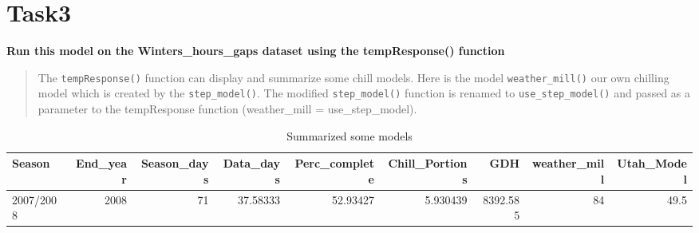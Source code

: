 \documentclass[
]{book}
\newenvironment{Shaded}{\begin{snugshade}}{\end{snugshade}}
\newcommand{\CommentTok}[1]{\textcolor[rgb]{0.56,0.35,0.01}{\textit{#1}}}
\newcommand{\DataTypeTok}[1]{\textcolor[rgb]{0.13,0.29,0.53}{#1}}
\newcommand{\DecValTok}[1]{\textcolor[rgb]{0.00,0.00,0.81}{#1}}
\newcommand{\KeywordTok}[1]{\textcolor[rgb]{0.13,0.29,0.53}{\textbf{#1}}}
\newcommand{\NormalTok}[1]{#1}
\newcommand{\OperatorTok}[1]{\textcolor[rgb]{0.81,0.36,0.00}{\textbf{#1}}}
\newcommand{\StringTok}[1]{\textcolor[rgb]{0.31,0.60,0.02}{#1}}
\begin{document}
\hypertarget{task3}{%
\section{Task3}\label{task3}}

\textbf{Run this model on the Winters\_hours\_gaps dataset using the tempResponse() function}

\begin{quote}
The \texttt{tempResponse()} function can display and summarize some chill models. Here is the model \texttt{weather\_mill()} our own chilling model which is created by the \texttt{step\_model()}. The modified \texttt{step\_model()} function is renamed to \texttt{use\_step\_model()} and passed as a parameter to the tempResponse function (weather\_mill = use\_step\_model).
\end{quote}

\begin{Shaded}
\end{Shaded}

\begin{table}

\caption{\label{tab:unnamed-chunk-13}Summarized some models}
\fontsize{7}{9}\selectfont
\begin{tabular}[t]{l|r|r|r|r|r|r|r|r}
\hline
Season & End\_year & Season\_days & Data\_days & Perc\_complete & Chill\_Portions & GDH & weather\_mill & Utah\_Model\\
\hline
2007/2008 & 2008 & 71 & 37.58333 & 52.93427 & 5.930439 & 8392.585 & 84 & 49.5\\
\hline
\end{tabular}
\end{table}
\end{document}

